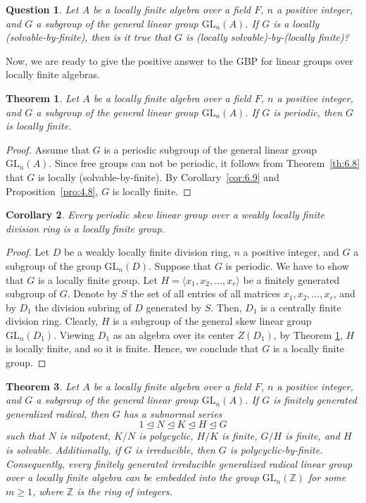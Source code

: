 \documentclass{amsart}
\newtheorem{theorem}{Theorem}[section]
\newtheorem{question}{Question}
\newtheorem{corollary}[theorem]{Corollary}
\theoremstyle{definition}
\begin{document}
\begin{question} Let $A$ be a locally finite algebra over a field $F$, $n$ a positive integer, and $G$ a subgroup of the general linear group $\mathrm{GL}_n(A)$. If $G$ is  a locally (solvable-by-finite), then is it true that $G$ is (locally solvable)-by-(locally finite)?
\end{question}
Now, we are ready to give the positive answer to 
the GBP for linear groups over locally finite algebras.
\begin{theorem}\label{th:6.11} Let $A$ be a locally finite algebra over a field $F$, $n$ a positive integer, and $G$ a subgroup of the general linear group $\mathrm{GL}_n(A)$. If $G$ is periodic, then $G$ is locally finite. 
\end{theorem}
\begin{proof} Assume that $G$ is a periodic subgroup of the general linear group $\mathrm{GL}_n(A).$ Since free groups can not be periodic, it follows from Theorem~\ref{th:6.8} that $G$ is locally (solvable-by-finite). By Corollary~\ref{cor:6.9} and Proposition~\ref{pro:4.8}, $G$ is locally finite. 
\end{proof}
\begin{corollary}\label{cor:6.12} Every periodic skew linear group over a weakly locally finite division ring is a locally finite group.
\end{corollary}
\begin{proof} Let $D$ be a weakly locally finite division ring, $n$ a positive integer, and $G$ a subgroup of the group $\mathrm{GL}_n(D)$. Suppose that $G$ is periodic. We have to show that $G$ is a locally finite group. Let $H=\langle x_1, x_2, \ldots, x_r\rangle$ be a finitely generated subgroup of $G$. Denote by $S$ the set of all entries of all matrices $x_1, x_2, \ldots, x_r$, and by $D_1$ the division subring of $D$ generated by $S$. Then, $D_1$ is a centrally finite division ring. Clearly, $H$ is a subgroup of the general skew linear group $\mathrm{GL}_n(D_1)$. Viewing $D_1$ as an algebra over its center $Z(D_1)$, by Theorem \ref{th:6.11}, $H$ is locally finite, and so it is finite. Hence, we conclude that $G$ is a locally finite group.
\end{proof}
\begin{theorem}\label{th:6.13} Let $A$ be a locally finite algebra over a field $F$, $n$ a positive integer, and $G$ a subgroup of the general linear group $\mathrm{GL}_n(A)$. If $G$ is finitely generated generalized radical, then $G$ has a subnormal series $$1\trianglelefteq N\trianglelefteq K\trianglelefteq H\trianglelefteq G$$ such that $N$ is nilpotent, $K/N$ is polycyclic, $H/K$ is finite, $G/H$ is finite, and $H$ is solvable. Additionally, if $G$ is irreducible, then $G$ is polycyclic-by-finite. Consequently, every finitely generated irreducible generalized radical linear group over a locally finite algebra can be embedded into the group $\mathrm{GL}_n(\mathbb{Z})$ for some $m\geq 1$, where $\mathbb{Z}$ is the ring of integers.
\end{theorem}
\end{document}
